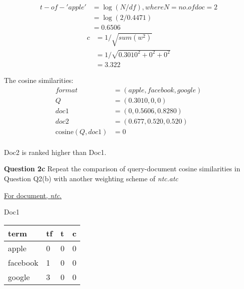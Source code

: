 \documentclass[11pt,a4paper]{report}
\begin{document}
\begin{multicols*}{2}
\begin{equation*} 
\begin{split}
t-of-'apple' & = \log(N/df),where N = no. of doc = 2 \\
 & = \log(2/0.4471) \\
 & = 0.6506
\end{split}
\end{equation*}
\begin{equation*}
\begin{split}
c &= 1 / \sqrt{sum(w^2)} \\
  &= 1 / \sqrt{0.3010^2 + 0^2 + 0^2} \\
  &= 3.322
\end{split}
\end{equation*}

\begin{minipage}{\hsize}
The cosine similarities:
\begin{equation*}
\begin{split}
format &= (apple, facebook, google)\\
Q &= (0.3010, 0, 0)\\
doc1 &= (0, 0.5606 ,0.8280)\\
doc2 &= (0.677, 0.520, 0.520)\\
\text{cosine}(Q, doc1) &= 0\\
\end{split}
\end{equation*}

Doc2 is ranked higher than Doc1.\\
\end{minipage}

\noindent \textbf{Question 2c} Repeat the comparison of query-document cosine similarities in Question Q2(b) with another weighting scheme of \textit{ntc.atc}

\noindent \underline{For document, \textit{ntc}.}

\noindent Doc1

\begin{center}
\begin{tabular}{|l | l | l | l|}
    \hline
    term     & tf & t & c \\
    \hline
    apple    & 0 & 0 & 0 \\
    facebook & 1 & 0 & 0 \\
    google   & 3 & 0 & 0 \\
    \hline
\end{tabular}
\end{center}


\end{multicols*}
\end{document}

